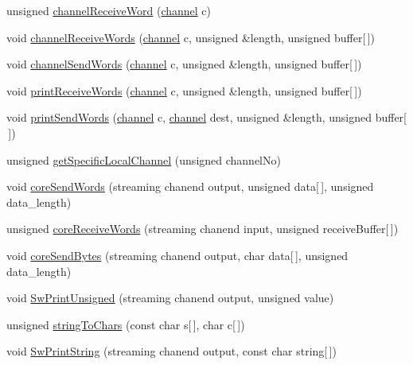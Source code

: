 \begin{DoxyCompactItemize}
\item 
unsigned \hyperlink{_swallow-helpers_8xc_a7af156772a17978b0db4f1f209da7bdd}{channel\+Receive\+Word} (\hyperlink{_swallow-helpers_8h_aa6ea79b51cb1a11714e12ddd689dd15c}{channel} c)
\item 
void \hyperlink{_swallow-helpers_8xc_a7b41998c9b6ff64733cf388aab7f21b1}{channel\+Receive\+Words} (\hyperlink{_swallow-helpers_8h_aa6ea79b51cb1a11714e12ddd689dd15c}{channel} c, unsigned \&length, unsigned buffer\mbox{[}$\,$\mbox{]})
\item 
void \hyperlink{_swallow-helpers_8xc_ab09ce1b802b3c3c3a13b80db7139191d}{channel\+Send\+Words} (\hyperlink{_swallow-helpers_8h_aa6ea79b51cb1a11714e12ddd689dd15c}{channel} c, unsigned \&length, unsigned buffer\mbox{[}$\,$\mbox{]})
\item 
void \hyperlink{_swallow-helpers_8xc_ad2bd3e35e98c361a123802d89f23292d}{print\+Receive\+Words} (\hyperlink{_swallow-helpers_8h_aa6ea79b51cb1a11714e12ddd689dd15c}{channel} c, unsigned \&length, unsigned buffer\mbox{[}$\,$\mbox{]})
\item 
void \hyperlink{_swallow-helpers_8xc_a1c66ffa18e1dfc18667ee4aedfc32b25}{print\+Send\+Words} (\hyperlink{_swallow-helpers_8h_aa6ea79b51cb1a11714e12ddd689dd15c}{channel} c, \hyperlink{_swallow-helpers_8h_aa6ea79b51cb1a11714e12ddd689dd15c}{channel} dest, unsigned \&length, unsigned buffer\mbox{[}$\,$\mbox{]})
\item 
unsigned \hyperlink{_swallow-helpers_8xc_ad40c30ba1915e96e0addb8cc251e30c4}{get\+Specific\+Local\+Channel} (unsigned channel\+No)
\item 
void \hyperlink{_swallow-helpers_8xc_aef17d0ecd6fc0b716d8bd40a189075f7}{core\+Send\+Words} (streaming chanend output, unsigned data\mbox{[}$\,$\mbox{]}, unsigned data\+\_\+length)
\item 
unsigned \hyperlink{_swallow-helpers_8xc_adfe491501333abd26b2966f39837723e}{core\+Receive\+Words} (streaming chanend input, unsigned receive\+Buffer\mbox{[}$\,$\mbox{]})
\item 
void \hyperlink{_swallow-helpers_8xc_a38576ce5d46bc65b1e600ab2e793ab71}{core\+Send\+Bytes} (streaming chanend output, char data\mbox{[}$\,$\mbox{]}, unsigned data\+\_\+length)
\item 
void \hyperlink{_swallow-helpers_8xc_afbd3e0a5dbd4afafc3283a8a95fa750c}{Sw\+Print\+Unsigned} (streaming chanend output, unsigned value)
\item 
unsigned \hyperlink{_swallow-helpers_8xc_a2da912eccb2d640abfb2a3ebdbf3efbd}{string\+To\+Chars} (const char s\mbox{[}$\,$\mbox{]}, char c\mbox{[}$\,$\mbox{]})
\item 
void \hyperlink{_swallow-helpers_8xc_a454f40f7afcac737d38f0c5774dd62b8}{Sw\+Print\+String} (streaming chanend output, const char string\mbox{[}$\,$\mbox{]})
\end{DoxyCompactItemize}


